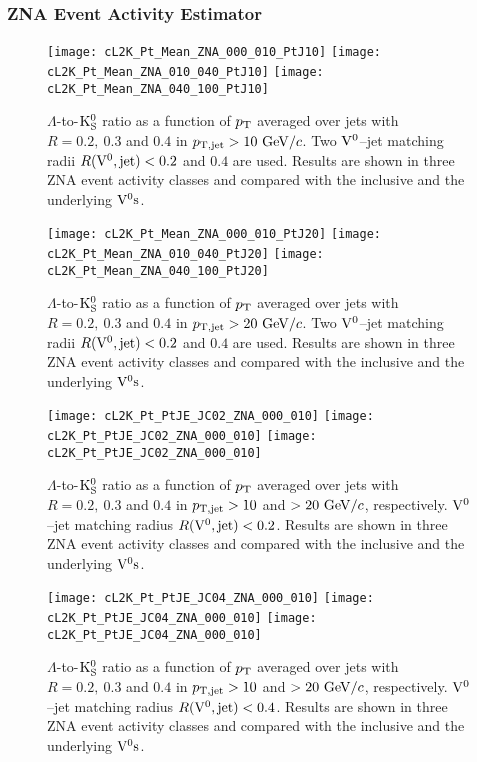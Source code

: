 \documentclass[12pt]{article}
\begin{document}
\newpage
\subsubsection{ZNA Event Activity Estimator}

\begin{figure}[htbp]
\centering
\texttt{[image: cL2K\_Pt\_Mean\_ZNA\_000\_010\_PtJ10]}
\texttt{[image: cL2K\_Pt\_Mean\_ZNA\_010\_040\_PtJ10]}
\texttt{[image: cL2K\_Pt\_Mean\_ZNA\_040\_100\_PtJ10]}
\caption{$\Lambda$-to-${\rm K}_{\rm S}^{0}$ ratio as a function of $p_{\rm T}$
  averaged over jets with
  $R=0.2,~0.3$ and $0.4$ in $p_{\rm T,jet}>10~{\rm GeV}/c$.
  Two ${\rm V}^{0}$--jet matching radii $R({\rm V}^{0},{\rm jet})<0.2$ and $0.4$ are used.
  Results are shown in three ZNA event activity classes and
  compared with the inclusive and the underlying ${\rm V}^{0}{\rm s}$.}
\label{fig:s01L2KJC0XZNAPtj10}
\end{figure}

\begin{figure}[htbp]
\centering
\texttt{[image: cL2K\_Pt\_Mean\_ZNA\_000\_010\_PtJ20]}
\texttt{[image: cL2K\_Pt\_Mean\_ZNA\_010\_040\_PtJ20]}
\texttt{[image: cL2K\_Pt\_Mean\_ZNA\_040\_100\_PtJ20]}
\caption{$\Lambda$-to-${\rm K}_{\rm S}^{0}$ ratio as a function of $p_{\rm T}$
  averaged over jets with
  $R=0.2,~0.3$ and $0.4$ in $p_{\rm T,jet}>20~{\rm GeV}/c$.
  Two ${\rm V}^{0}$--jet matching radii $R({\rm V}^{0},{\rm jet})<0.2$ and $0.4$ are used.
  Results are shown in three ZNA event activity classes and
  compared with the inclusive and the underlying ${\rm V}^{0}{\rm s}$.}
\label{fig:s01L2KJC0XZNAPtj20}
\end{figure}

\begin{figure}[htbp]
\centering
\texttt{[image: cL2K\_Pt\_PtJE\_JC02\_ZNA\_000\_010]}
\texttt{[image: cL2K\_Pt\_PtJE\_JC02\_ZNA\_000\_010]}
\texttt{[image: cL2K\_Pt\_PtJE\_JC02\_ZNA\_000\_010]}
\caption{$\Lambda$-to-${\rm K}_{\rm S}^{0}$ ratio as a function of $p_{\rm T}$
  averaged over jets with
  $R=0.2,~0.3$ and $0.4$ in $p_{\rm T,jet}>10$ and $>20~{\rm GeV}/c$,
  respectively.
  ${\rm V}^{0}$--jet matching radius $R({\rm V}^{0},{\rm jet})<0.2$.
  Results are shown in three ZNA event activity classes and
  compared with the inclusive and the underlying ${\rm V}^{0}{\rm s}$.}
\label{fig:s01L2KJC02ZNAPtjXX}
\end{figure}

\begin{figure}[htbp]
\centering
\texttt{[image: cL2K\_Pt\_PtJE\_JC04\_ZNA\_000\_010]}
\texttt{[image: cL2K\_Pt\_PtJE\_JC04\_ZNA\_000\_010]}
\texttt{[image: cL2K\_Pt\_PtJE\_JC04\_ZNA\_000\_010]}
\caption{$\Lambda$-to-${\rm K}_{\rm S}^{0}$ ratio as a function of $p_{\rm T}$
  averaged over jets with
  $R=0.2,~0.3$ and $0.4$ in $p_{\rm T,jet}>10$ and $>20~{\rm GeV}/c$,
  respectively.
  ${\rm V}^{0}$--jet matching radius $R({\rm V}^{0},{\rm jet})<0.4$.
  Results are shown in three ZNA event activity classes and
  compared with the inclusive and the underlying ${\rm V}^{0}{\rm s}$.}
\label{fig:s01L2KJC04ZNAPtjXX}
\end{figure}
\end{document}
